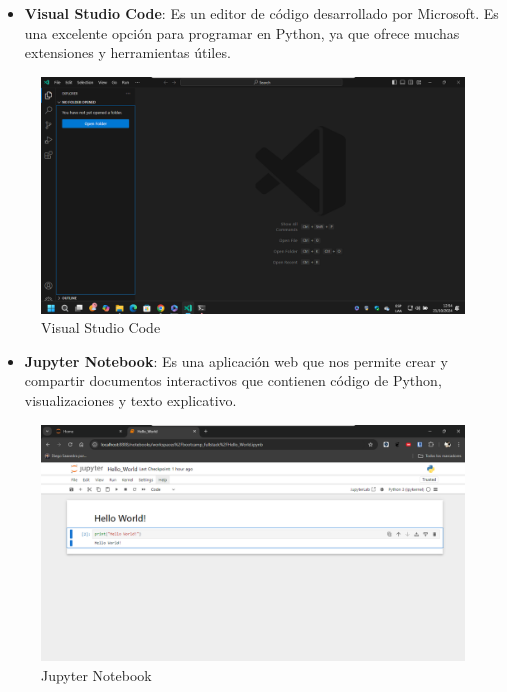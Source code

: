 \documentclass[
  a4paper,
  DIV=11,
  numbers=noendperiod,
  onepage,
  openany]{scrreprt}
\providecommand{\tightlist}{%
  \setlength{\itemsep}{0pt}\setlength{\parskip}{0pt}}\usepackage{longtable,booktabs,array}
\begin{document}
\begin{itemize}
\tightlist
\item
  \textbf{Visual Studio Code}: Es un editor de código desarrollado por
  Microsoft. Es una excelente opción para programar en Python, ya que
  ofrece muchas extensiones y herramientas útiles.
\end{itemize}

\begin{figure}[H]

{\centering \includegraphics{unidades/unidad1/images/vscode.png}

}

\caption{Visual Studio Code}

\end{figure}%

\begin{itemize}
\tightlist
\item
  \textbf{Jupyter Notebook}: Es una aplicación web que nos permite crear
  y compartir documentos interactivos que contienen código de Python,
  visualizaciones y texto explicativo.
\end{itemize}

\begin{figure}[H]

{\centering \includegraphics{unidades/unidad1/images/jupyter_notebook.png}

}

\caption{Jupyter Notebook}

\end{figure}%
\end{document}
